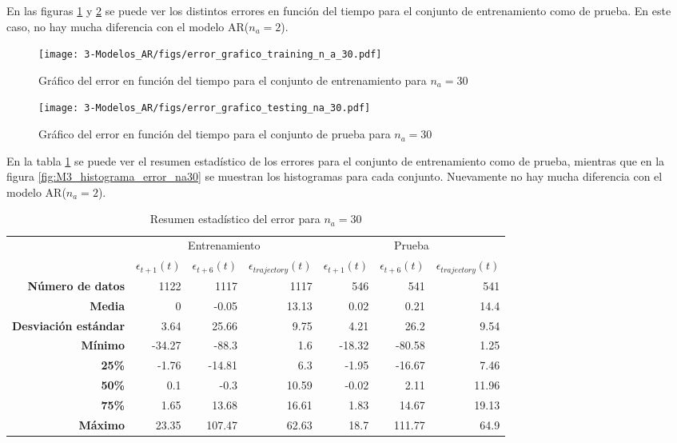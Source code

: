 En las figuras \ref{fig:M3_error_train_na30} y \ref{fig:M3_error_test_na30} se puede ver los distintos errores en función del tiempo para el conjunto de entrenamiento como de prueba. En este caso, no hay mucha diferencia con el modelo AR($n_a=2$).

\begin{figure}[H]
	\centering
	\texttt{[image: 3-Modelos\_AR/figs/error\_grafico\_training\_n\_a\_30.pdf]}
	\caption{Gráfico del error en función del tiempo para el conjunto de entrenamiento para $n_a=30$}
	\label{fig:M3_error_train_na30}
\end{figure}

\begin{figure}[H]
	\centering
	\texttt{[image: 3-Modelos\_AR/figs/error\_grafico\_testing\_na\_30.pdf]}
	\caption{Gráfico del error en función del tiempo para el conjunto de prueba para $n_a=30$}
	\label{fig:M3_error_test_na30}
\end{figure}


En la tabla \ref{table:M3_error_na30} se puede ver el resumen estadístico de los errores para el conjunto de entrenamiento como de prueba, mientras que en la figura \ref{fig:M3_histograma_error_na30} se muestran los histogramas para cada conjunto. Nuevamente no hay mucha diferencia con el modelo AR($n_a=2$).

\begin{table}[H]
	\centering
	\begin{tabular}{rrrr|rrr}
		\hline \hline
		& \multicolumn{3}{c|}{Entrenamiento} & \multicolumn{3}{c}{Prueba} \\
		& $\epsilon_{t+1}(t)$  & $\epsilon_{t+6}(t)$       & $\epsilon_{trajectory}(t)$     & $\epsilon_{t+1}(t)$      & $\epsilon_{t+6}(t)$      &$\epsilon_{trajectory}(t)$     \\ \hline
		\textbf{Número de datos}     & 1122       & 1117      & 1117      & 546     & 541     & 541    \\
		\textbf{Media}               & 0 	      & -0.05     & 13.13     & 0.02    & 0.21    & 14.4   \\
		\textbf{Desviación estándar} & 3.64       & 25.66     & 9.75      & 4.21    & 26.2    & 9.54   \\
		\textbf{Mínimo}              & -34.27     & -88.3     & 1.6       & -18.32  & -80.58  & 1.25   \\
		\textbf{25\%}                & -1.76      & -14.81    & 6.3       & -1.95   & -16.67  & 7.46   \\
		\textbf{50\%}                & 0.1        & -0.3      & 10.59     & -0.02   & 2.11    & 11.96  \\
		\textbf{75\%}                & 1.65       & 13.68     & 16.61     & 1.83    & 14.67   & 19.13  \\
		\textbf{Máximo}              & 23.35      & 107.47    & 62.63     & 18.7    & 111.77  & 64.9   \\ \hline \hline
	\end{tabular}
	\caption{Resumen estadístico del error para $n_a=30$}
	\label{table:M3_error_na30}
\end{table}




